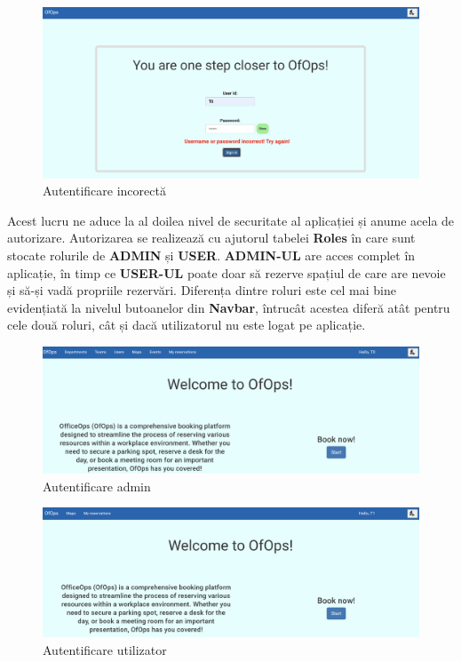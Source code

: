 \begin{figure}[!htb]
    \centering
    \includegraphics[width=0.9\linewidth]{images/autentificare-gresita.png}
    \caption{Autentificare incorectă}
    \label{fig:autentificare-gresita}
\end{figure}

Acest lucru ne aduce la al doilea nivel de securitate al aplicației și anume acela de autorizare. Autorizarea se realizează cu ajutorul tabelei \textbf{Roles} în care sunt stocate rolurile de \textbf{ADMIN} și \textbf{USER}. \textbf{ADMIN-UL} are acces complet în aplicație, în timp ce \textbf{USER-UL} poate doar să rezerve spațiul de care are nevoie și să-și vadă propriile rezervări. Diferența dintre roluri este cel mai bine evidențiată la nivelul butoanelor din \textbf{Navbar}, întrucât acestea diferă atât pentru cele două roluri, cât și dacă utilizatorul nu este logat pe aplicație. 

\begin{figure}[!htb]
    \centering
    \includegraphics[width=0.9\linewidth]{images/pagina-admin.png}
    \caption{Autentificare admin}
    \label{fig:pagina-admin}
\end{figure}

\newpage
\begin{figure}[!htb]
    \centering
    \includegraphics[width=0.9\linewidth]{images/pagina-utilizator.png}
    \caption{Autentificare utilizator}
    \label{fig:pagina-utilizator}
\end{figure}

